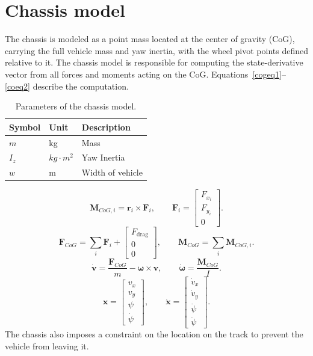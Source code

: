 \section{Chassis model}
The chassis is modeled as a point mass located at the center of gravity (CoG), carrying the full vehicle mass and yaw inertia, with the wheel pivot points defined relative to it. The chassis model is responsible for computing the state-derivative vector from all forces and moments acting on the CoG. Equations~\ref{cogeq1}--\ref{coeq2} describe the computation.
\begin{table}[!ht]
	\centering
	\begin{tabular}{lll}
		\hline
		\textbf{Symbol} & \textbf{Unit}     & \textbf{Description}                            \\
		\hline
		$m$             & kg          & Mass       \\
		$I_z$           & $kg \cdot m^2$               & Yaw Inertia                               \\
		$w$             & m & Width of vehicle \\
		\hline
	\end{tabular}
	\caption{Parameters of the chassis model.}
	\label{tab:chassis-params}
\end{table}

\begin{equation}
    \symbf{M}_{\!CoG,i} = \symbf{r}_i \times \symbf{F}_i, \qquad
    \symbf{F}_i = \begin{bmatrix} F_{x_i} \\ F_{y_i} \\ 0 \end{bmatrix}.
    \label{cogeq1}
\end{equation}
\begin{equation}
    \symbf{F}_{\!CoG} = \sum_i \symbf{F}_i + \begin{bmatrix} F_\text{drag} \\ 0 \\ 0 \end{bmatrix}, \qquad
    \symbf{M}_{\!CoG} = \sum_i \symbf{M}_{\!CoG,i}.
\end{equation}
\begin{equation}
    \dot{\symbf{v}} = \frac{\symbf{F}_{\!CoG}}{m} - \symbf{\omega} \times \symbf{v}, \qquad
    \dot{\symbf{\omega}} = \frac{\symbf{M}_{\!CoG}}{I}.
\end{equation}
\begin{equation}
    \symbf{x} = \begin{bmatrix} v_x \\ v_y \\ \psi \\ \dot{\psi} \end{bmatrix}, \qquad
    \dot{\symbf{x}} = \begin{bmatrix} \dot{v}_x \\ \dot{v}_y \\ \dot{\psi} \\ \ddot{\psi} \end{bmatrix}.
    \label{coeq2}
\end{equation}
The chassis also imposes a constraint on the location on the track to prevent the vehicle from leaving it.


